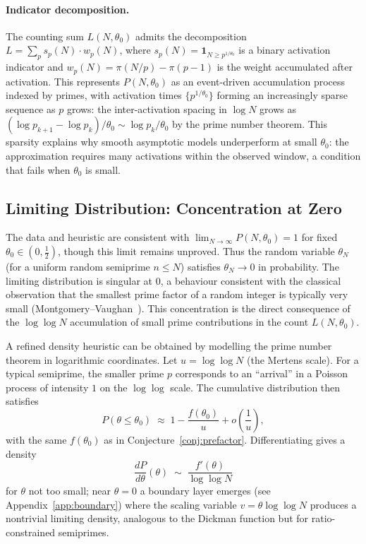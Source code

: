 \documentclass[11pt]{article}
\theoremstyle{definition}
\begin{document}
\paragraph{Indicator decomposition.}
The counting sum \(L(N,\theta_0)\) admits the decomposition
\(L = \sum_p s_p(N)\cdot w_p(N)\), where
\(s_p(N) = \mathbf{1}_{N \ge p^{1/\theta_0}}\) is a binary activation
indicator and \(w_p(N) = \pi(N/p) - \pi(p-1)\) is the weight
accumulated after activation.  This represents \(P(N,\theta_0)\) as
an event-driven accumulation process indexed by primes, with
activation times \(\{p^{1/\theta_0}\}\) forming an increasingly
sparse sequence as \(p\) grows: the inter-activation spacing in
\(\log N\) grows as \((\log p_{k+1} - \log p_k)/\theta_0 \sim
\log p_k/\theta_0\) by the prime number theorem.  This sparsity
explains why smooth asymptotic models underperform at small
\(\theta_0\): the approximation requires many activations within
the observed window, a condition that fails when \(\theta_0\) is small.

\subsection{Limiting Distribution: Concentration at Zero}
\label{sec:limiting}

The data and heuristic are consistent with
\(\lim_{N\to\infty}P(N,\theta_0)=1\) for fixed
\(\theta_0\in(0,\tfrac12)\), though this limit remains unproved.  Thus the random variable \(\theta_N\) (for a
uniform random semiprime \(n\le N\)) satisfies \(\theta_N\to 0\) in probability.
The limiting distribution is singular at \(0\), a behaviour consistent with the
classical observation that the smallest prime factor of a random integer is typically
very small (Montgomery--Vaughan~\cite{montgomery2007}).  This concentration
is the direct consequence of the \(\log\log N\) accumulation of small prime
contributions in the count \(L(N,\theta_0)\).

A refined density heuristic can be obtained by modelling the prime number theorem in
logarithmic coordinates.  Let \(u = \log\log N\) (the Mertens scale).  For a typical
semiprime, the smaller prime \(p\) corresponds to an ``arrival'' in a Poisson process
of intensity \(1\) on the \(\log\log\) scale.  The cumulative distribution then
satisfies
\[
P(\theta\le\theta_0) \;\approx\; 1 - \frac{f(\theta_0)}{u} + o\!\left(\frac1u\right),
\]
with the same \(f(\theta_0)\) as in Conjecture~\ref{conj:prefactor}.  Differentiating
gives a density
\[
\frac{dP}{d\theta}(\theta) \;\sim\; \frac{f'(\theta)}{\log\log N}
\]
for \(\theta\) not too small; near \(\theta=0\) a boundary layer emerges (see
Appendix~\ref{app:boundary}) where the scaling variable \(v = \theta\log\log N\)
produces a nontrivial limiting density, analogous to the Dickman function but for
ratio-constrained semiprimes.
\end{document}
